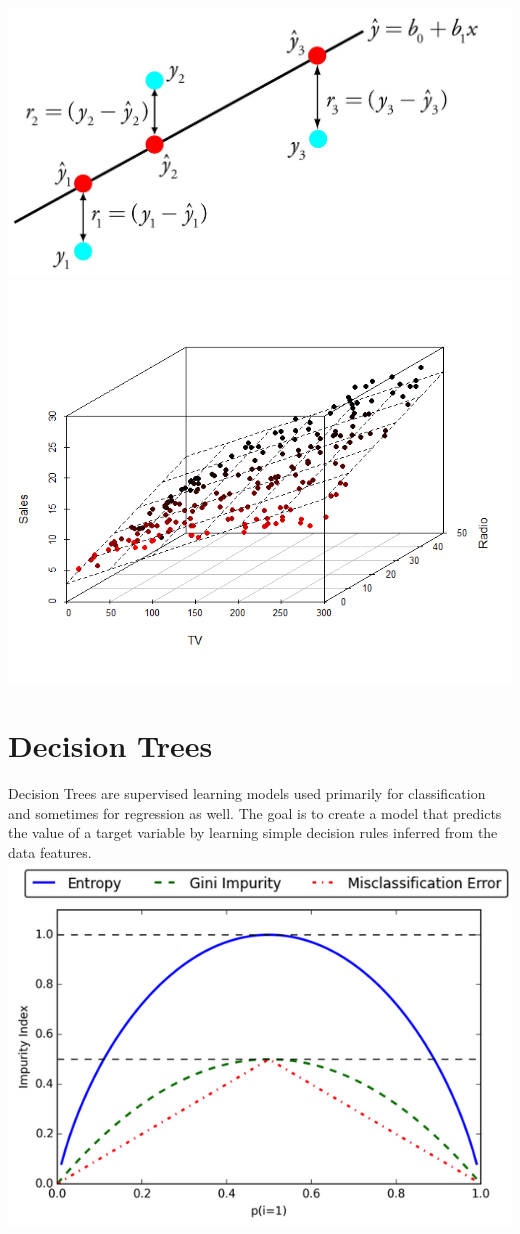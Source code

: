 \documentclass[11pt]{article}
\begin{document}
\noindent \includegraphics[width=\textwidth]{linear_reg.jpeg}
\noindent \includegraphics[width=\textwidth]{lr_3d.png}

\section{Decision Trees}

Decision Trees are supervised learning models used primarily for classification and sometimes for regression as well. The goal is to create a model that predicts the value of a target variable by learning simple decision rules inferred from the data features.\\

\noindent \includegraphics[width=\textwidth]{d-trees.png}
\end{document}
